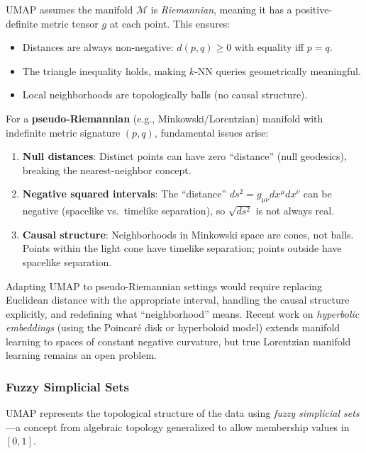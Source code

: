 \begin{remark}\label{rem:umap-riemannian}
  UMAP assumes the manifold $\mathcal{M}$ is \emph{Riemannian}, meaning it has a positive-definite metric tensor $g$ at each point. This ensures:
  \begin{itemize}
    \item Distances are always non-negative: $d(p,q) \geq 0$ with equality iff $p = q$.
    \item The triangle inequality holds, making $k$-NN queries geometrically meaningful.
    \item Local neighborhoods are topologically balls (no causal structure).
  \end{itemize}

  For a \textbf{pseudo-Riemannian} (e.g., Minkowski/Lorentzian) manifold with indefinite metric signature $(p,q)$, fundamental issues arise:
  \begin{enumerate}
    \item \textbf{Null distances}: Distinct points can have zero ``distance'' (null geodesics), breaking the nearest-neighbor concept.
    \item \textbf{Negative squared intervals}: The ``distance'' $ds^2 = g_{\mu\nu}dx^\mu dx^\nu$ can be negative (spacelike vs.\ timelike separation), so $\sqrt{ds^2}$ is not always real.
    \item \textbf{Causal structure}: Neighborhoods in Minkowski space are cones, not balls. Points within the light cone have timelike separation; points outside have spacelike separation.
  \end{enumerate}

  Adapting UMAP to pseudo-Riemannian settings would require replacing Euclidean distance with the appropriate interval, handling the causal structure explicitly, and redefining what ``neighborhood'' means. Recent work on \emph{hyperbolic embeddings} (using the Poincar\'e disk or hyperboloid model) extends manifold learning to spaces of constant negative curvature, but true Lorentzian manifold learning remains an open problem.
\end{remark}

\subsubsection{Fuzzy Simplicial Sets}

UMAP represents the topological structure of the data using \emph{fuzzy simplicial sets}---a concept from algebraic topology generalized to allow membership values in $[0,1]$.

